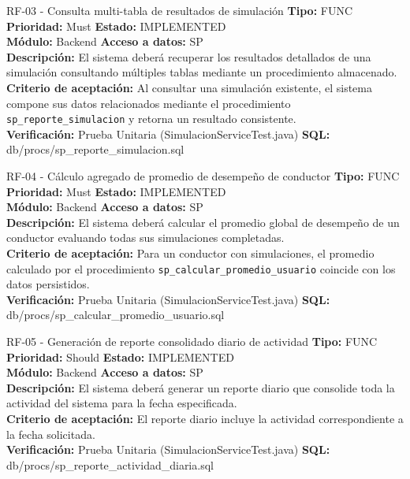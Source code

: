 \documentclass[11pt,a4paper]{article}
\begin{document}
\begin{requisito}{RF-03 - Consulta multi-tabla de resultados de simulación}
    \textbf{Tipo:} FUNC \quad \textbf{Prioridad:} Must \quad \textbf{Estado:} IMPLEMENTED \\[0.2cm]
    \textbf{Módulo:} Backend \quad \textbf{Acceso a datos:} SP \\[0.2cm]
    \textbf{Descripción:} El sistema deberá recuperar los resultados detallados de una simulación consultando múltiples tablas mediante un procedimiento almacenado. \\[0.2cm]
    \textbf{Criterio de aceptación:} Al consultar una simulación existente, el sistema compone sus datos relacionados mediante el procedimiento \texttt{sp\_reporte\_simulacion} y retorna un resultado consistente. \\[0.2cm]
    \textbf{Verificación:} Prueba Unitaria (SimulacionServiceTest.java) \quad \textbf{SQL:} db/procs/sp\_reporte\_simulacion.sql
\end{requisito}

\begin{requisito}{RF-04 - Cálculo agregado de promedio de desempeño de conductor}
    \textbf{Tipo:} FUNC \quad \textbf{Prioridad:} Must \quad \textbf{Estado:} IMPLEMENTED \\[0.2cm]
    \textbf{Módulo:} Backend \quad \textbf{Acceso a datos:} SP \\[0.2cm]
    \textbf{Descripción:} El sistema deberá calcular el promedio global de desempeño de un conductor evaluando todas sus simulaciones completadas. \\[0.2cm]
    \textbf{Criterio de aceptación:} Para un conductor con simulaciones, el promedio calculado por el procedimiento \texttt{sp\_calcular\_promedio\_usuario} coincide con los datos persistidos. \\[0.2cm]
    \textbf{Verificación:} Prueba Unitaria (SimulacionServiceTest.java) \quad \textbf{SQL:} db/procs/sp\_calcular\_promedio\_usuario.sql
\end{requisito}

\begin{requisito}{RF-05 - Generación de reporte consolidado diario de actividad}
    \textbf{Tipo:} FUNC \quad \textbf{Prioridad:} Should \quad \textbf{Estado:} IMPLEMENTED \\[0.2cm]
    \textbf{Módulo:} Backend \quad \textbf{Acceso a datos:} SP \\[0.2cm]
    \textbf{Descripción:} El sistema deberá generar un reporte diario que consolide toda la actividad del sistema para la fecha especificada. \\[0.2cm]
    \textbf{Criterio de aceptación:} El reporte diario incluye la actividad correspondiente a la fecha solicitada. \\[0.2cm]
    \textbf{Verificación:} Prueba Unitaria (SimulacionServiceTest.java) \quad \textbf{SQL:} db/procs/sp\_reporte\_actividad\_diaria.sql
\end{requisito}
\end{document}
